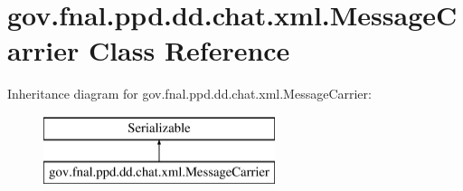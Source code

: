\hypertarget{classgov_1_1fnal_1_1ppd_1_1dd_1_1chat_1_1xml_1_1MessageCarrier}{\section{gov.\-fnal.\-ppd.\-dd.\-chat.\-xml.\-Message\-Carrier Class Reference}
\label{classgov_1_1fnal_1_1ppd_1_1dd_1_1chat_1_1xml_1_1MessageCarrier}
}
Inheritance diagram for gov.\-fnal.\-ppd.\-dd.\-chat.\-xml.\-Message\-Carrier\-:\begin{figure}[H]
\begin{center}
\leavevmode
\includegraphics[height=2.000000cm]{classgov_1_1fnal_1_1ppd_1_1dd_1_1chat_1_1xml_1_1MessageCarrier}
\end{center}
\end{figure}
